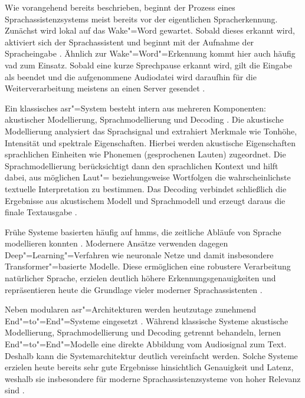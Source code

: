 Wie vorangehend bereits beschrieben, beginnt der Prozess eines Sprachassistenzsystems meist bereits vor der eigentlichen Spracherkennung. Zunächst wird lokal auf das Wake"=Word gewartet. Sobald dieses erkannt wird, aktiviert sich der Sprachassistent und beginnt mit der Aufnahme der Spracheingabe \autocite{tiredWakeWords}. Ähnlich zur Wake"=Word"=Erkennung kommt hier auch häufig \gls{vad} zum Einsatz. Sobald eine kurze Sprechpause erkannt wird, gilt die Eingabe als beendet und die aufgenommene Audiodatei wird daraufhin für die Weiterverarbeitung meistens an einen Server gesendet \autocite{speechtoTextTexttoSpeechRecognition}.

Ein klassisches \gls{asr}"=System besteht intern aus mehreren Komponenten: akustischer Modellierung, Sprachmodellierung und Decoding \autocite{speechtoTextTexttoSpeechRecognition,EDPBLeitlinienSprachassistenzsysteme}. Die akustische Modellierung analysiert das Sprachsignal und extrahiert Merkmale wie Tonhöhe, Intensität und spektrale Eigenschaften. Hierbei werden akustische Eigenschaften sprachlichen Einheiten wie Phonemen (gesprochenen Lauten) zugeordnet. Die Sprachmodellierung berücksichtigt dann den sprachlichen Kontext und hilft dabei, aus möglichen Laut"= beziehungsweise Wortfolgen die wahrscheinlichste textuelle Interpretation zu bestimmen. Das Decoding verbindet schließlich die Ergebnisse aus akustischem Modell und Sprachmodell und erzeugt daraus die finale Textausgabe \autocite{speechtoTextTexttoSpeechRecognition}.

Frühe Systeme basierten häufig auf \glspl{hmm}, die zeitliche Abläufe von Sprache modellieren konnten \autocite{speechtoTextTexttoSpeechRecognition}. Modernere Ansätze verwenden dagegen Deep"=Learning"=Verfahren wie neuronale Netze und damit insbesondere Transformer"=basierte Modelle. Diese ermöglichen eine robustere Verarbeitung natürlicher Sprache, erzielen deutlich höhere Erkennungsgenauigkeiten und repräsentieren heute die Grundlage vieler moderner Sprachassistenten \autocite{speechtoTextTexttoSpeechRecognition}.

Neben modularen \gls{asr}"=Architekturen werden heutzutage zunehmend End"=to"=End"=Systeme eingesetzt \autocite{EDPBLeitlinienSprachassistenzsysteme}. Während klassische Systeme akustische Modellierung, Sprachmodellierung und Decoding getrennt behandeln, lernen End"=to"=End"=Modelle eine direkte Abbildung vom Audiosignal zum Text. Deshalb kann die Systemarchitektur deutlich vereinfacht werden. Solche Systeme erzielen heute bereits sehr gute Ergebnisse hinsichtlich Genauigkeit und Latenz, weshalb sie insbesondere für moderne Sprachassistenzsysteme von hoher Relevanz sind \autocite{speechtoTextTexttoSpeechRecognition}.

